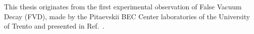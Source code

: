 This thesis originates from the first experimental observation of False Vacuum Decay (FVD), made by the Pitaevskii BEC Center laboratories of the University of Trento and presented in Ref.\ \cite{zenesini2024false}.